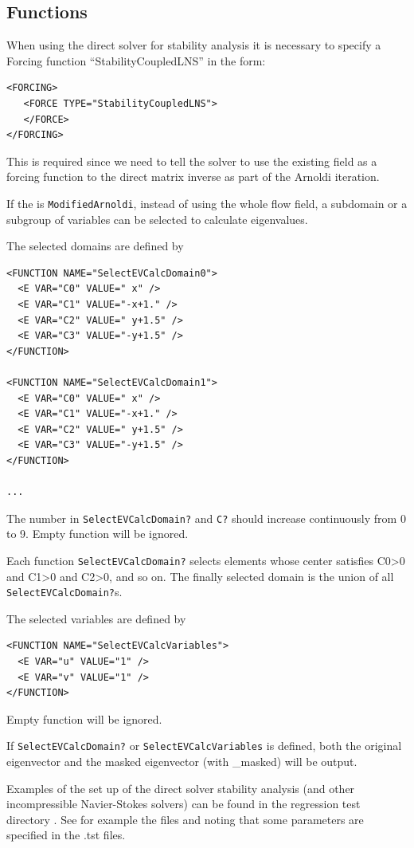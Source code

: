 \subsection{Functions}
When using the direct solver for stability analysis it is necessary to specify a Forcing function ``StabilityCoupledLNS'' in the form:
\begin{lstlisting}[style=XMLStyle]
<FORCING>
   <FORCE TYPE="StabilityCoupledLNS">
   </FORCE>
</FORCING>
\end{lstlisting}

This is required since we need to tell the solver to use the existing
field as a forcing function to the direct matrix inverse as part of
the Arnoldi iteration.

If the  is \texttt{ModifiedArnoldi}, instead of using the whole flow field, a subdomain or a subgroup of variables can be selected to calculate eigenvalues.

The selected domains are defined by
\begin{lstlisting}[style=XMLStyle]
<FUNCTION NAME="SelectEVCalcDomain0">
  <E VAR="C0" VALUE=" x" />
  <E VAR="C1" VALUE="-x+1." />
  <E VAR="C2" VALUE=" y+1.5" />
  <E VAR="C3" VALUE="-y+1.5" />
</FUNCTION>

<FUNCTION NAME="SelectEVCalcDomain1">
  <E VAR="C0" VALUE=" x" />
  <E VAR="C1" VALUE="-x+1." />
  <E VAR="C2" VALUE=" y+1.5" />
  <E VAR="C3" VALUE="-y+1.5" />
</FUNCTION>

...
\end{lstlisting}
The number in \texttt{SelectEVCalcDomain?} and \texttt{C?} should increase continuously from 0 to 9. Empty function will be ignored.

Each function \texttt{SelectEVCalcDomain?} selects elements whose center satisfies C0>0 and C1>0 and C2>0, and so on.
The finally selected domain is the union of all \texttt{SelectEVCalcDomain?}s.

The selected variables are defined by
\begin{lstlisting}[style=XMLStyle]
<FUNCTION NAME="SelectEVCalcVariables">
  <E VAR="u" VALUE="1" />
  <E VAR="v" VALUE="1" />
</FUNCTION>
\end{lstlisting}
Empty function will be ignored.

If \texttt{SelectEVCalcDomain?} or \texttt{SelectEVCalcVariables} is defined, both the original eigenvector and the masked eigenvector (with \_masked) will be output.


\begin{notebox}
Examples of the set up of the direct solver stability analysis (and
other incompressible Navier-Stokes solvers) can be found in the
regression test directory
. See for example the files
 and 
noting that some parameters are specified in the .tst files.
\end{notebox}

